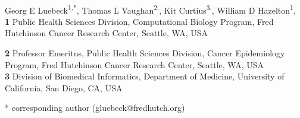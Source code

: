 \documentclass[10pt,letterpaper]{article}
\begin{document}
\vspace*{0.2in}

\begin{flushleft}
{\Large
\textbf{}}
\newline
\\
Georg E Luebeck\textsuperscript{1,*},
Thomas L Vaughan\textsuperscript{2,},
Kit Curtius\textsuperscript{3,},
William D Hazelton\textsuperscript{1},
\\
\bigskip
\textbf{1} Public Health Sciences Division, Computational Biology Program, Fred Hutchinson Cancer Research Center, Seattle, WA, USA

\textbf{2} Professor Emeritus, Public Health Sciences Division, Cancer Epidemiology Program, Fred Hutchinson Cancer Research Center, Seattle, WA, USA
\\
\textbf{3} Division of Biomedical Informatics, Department of Medicine,
University of California, San Diego, CA, USA
\\
\bigskip

% 
%





* corresponding author (gluebeck@fredhutch.org)

\end{flushleft}
\end{document}
